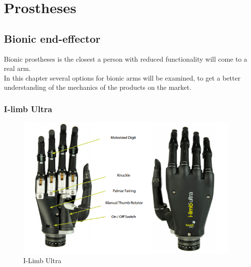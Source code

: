\chapter{Prostheses} \label{prostheses}
\section{Bionic end-effector}

Bionic prostheses is the closest a person with reduced functionality will come to a real arm.\\
In this chapter several options for bionic arms will be examined, to get a better understanding of the mechanics of the products on the market.\\

\subsection{I-limb Ultra}

\begin{figure}[H]
    \centering
    \includegraphics[width=12cm]{Sections/Contextual_Analysis/ProsthesesPics/i-limbultra.png}
    \caption{I-Limb Ultra\cite{I-limbUltra}}
    \label{fig:Ilimb-Ultra}
\end{figure}

